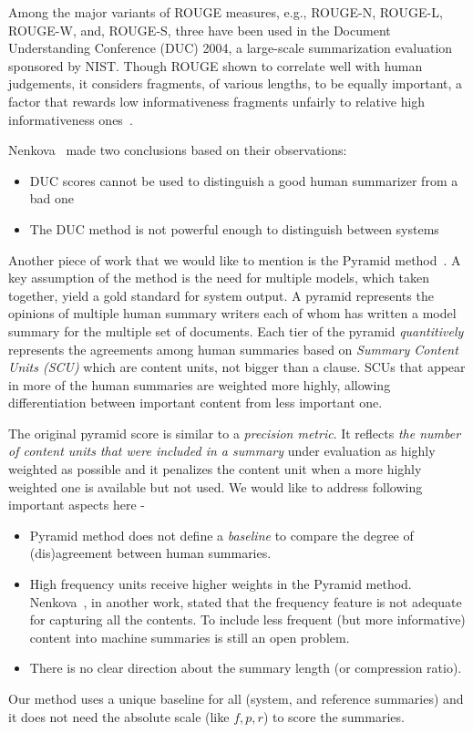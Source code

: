 \documentclass[a4paper]{report}
\begin{document}
\par Among the major variants of ROUGE measures, e.g., ROUGE-N, ROUGE-L, ROUGE-W, and, ROUGE-S, three have been used in the Document Understanding Conference (DUC) 2004, a large-scale summarization evaluation sponsored by NIST. Though ROUGE shown to correlate well with human judgements, it considers fragments, of various lengths, to be equally important, a factor that rewards low informativeness fragments unfairly to relative high informativeness ones~\cite{Hovy06automatedsummarization}.
\par Nenkova~\cite{DBLP:conf/naacl/NenkovaP04} made two conclusions based on their observations:
\begin{itemize}[noitemsep, nolistsep] 
\item DUC scores cannot be used to distinguish a good human summarizer from a bad one
\item The DUC method is not powerful enough to distinguish between systems
\end{itemize}
\par  Another piece of work that we would like to mention is the Pyramid method~\cite{Nenkova:2007:PMI:1233912.1233913}. A key assumption of the method is the need for multiple models, which taken together, yield a gold standard for system output. A pyramid represents the opinions of multiple human summary writers each of whom has written a model summary for the multiple set of documents. Each tier of the pyramid \emph{quantitively} represents the agreements among human summaries based on \emph{Summary Content Units (SCU)} which are content units, not bigger than a clause. SCUs that appear in more of the human summaries are weighted more highly, allowing differentiation between important content from less important one. 
\par The original pyramid score is similar to a \emph{precision metric}. It reflects \emph{the number of content units that were included in a summary} under evaluation as highly weighted as possible and it penalizes the content unit when a more highly weighted one is available but not used. We would like to address following important aspects here - 
\begin{itemize}[noitemsep, nolistsep]
\item Pyramid method does not define a \emph{baseline} to compare the degree of (dis)agreement between human summaries.
\item High frequency units receive higher weights in the Pyramid method. Nenkova~\cite{nenkova-vanderwende-2005}, in another work, stated that the frequency feature is not adequate for capturing all the contents. To include less frequent (but more informative) content into machine summaries is still an open problem.
\item There is no clear direction about the summary length (or compression ratio).
\end{itemize}
Our method uses a unique baseline for all (system, and reference summaries) and it does not need the absolute scale (like $f,p,r$) to score the summaries.
\end{document}
